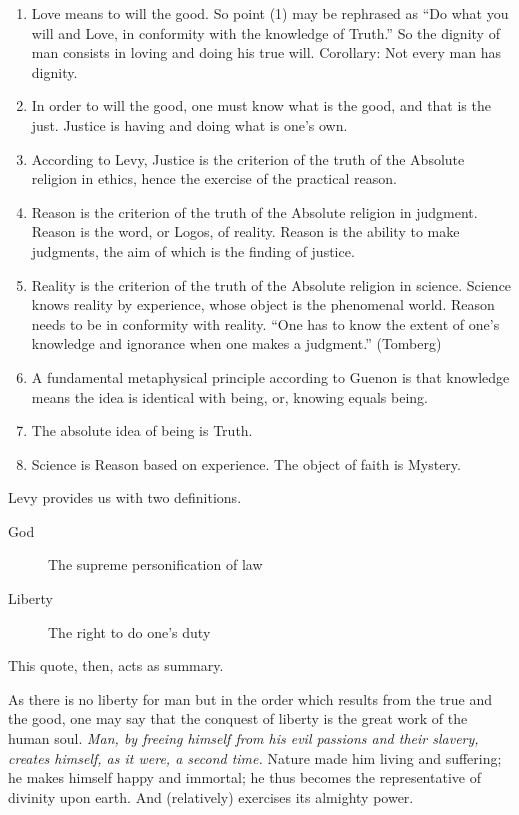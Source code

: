\begin{enumerate}
\item Love means to will the good. So point (1) may be rephrased as ``Do what you will and Love, in conformity with the knowledge of Truth.'' So the dignity of man consists in loving and doing his true will. Corollary: Not every man has dignity.
\item In order to will the good, one must know what is the good, and that is the just. Justice is having and doing what is one's own.
\item According to Levy, Justice is the criterion of the truth of the Absolute religion in ethics, hence the exercise of the practical reason.
\item Reason is the criterion of the truth of the Absolute religion in judgment. Reason is the word, or Logos, of reality. Reason is the ability to make judgments, the aim of which is the finding of justice.
\item Reality is the criterion of the truth of the Absolute religion in science. Science knows reality by experience, whose object is the phenomenal world. Reason needs to be in conformity with reality. ``One has to know the extent of one's knowledge and ignorance when one makes a judgment.'' (Tomberg)
\item A fundamental metaphysical principle according to Guenon is that knowledge means the idea is identical with being, or, knowing equals being.
\item The absolute idea of being is Truth.
\item Science is Reason based on experience. The object of faith is Mystery.
\end{enumerate}

Levy provides us with two definitions.

\begin{description}

\item[God]

The supreme personification of law
\item[Liberty]

The right to do one's duty
\end{description}


This quote, then, acts as summary.

\begin{quotex}
As there is no liberty for man but in the order which results from the true and the good, one may say that the conquest of liberty is the great work of the human soul. \emph{Man, by freeing himself from his evil passions and their slavery, creates himself, as it were, a second time.} Nature made him living and suffering; he makes himself happy and immortal; he thus becomes the representative of divinity upon earth. And (relatively) exercises its almighty power.
\end{quotex}


